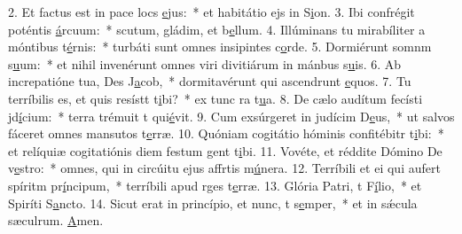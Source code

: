 2. Et factus est in pace locs \uline{e}jus:~* et habitátio ejs in S\uline{i}on.
3. Ibi confrégit poténtis \uline{á}rcuum:~* scutum, gládim, et b\uline{e}llum.
4. Illúminans tu mirabíliter a móntibus t\uline{é}rnis:~* turbáti sunt omnes insipintes c\uline{o}rde.
5. Dormiérunt somnm s\uline{u}um:~* et nihil invenérunt omnes viri divitiárum in mánbus s\uline{u}is.
6. Ab increpatióne tua, Des J\uline{a}cob,~* dormitavérunt qui ascendrunt \uline{e}quos.
7. Tu terríbilis es, et quis resístt t\uline{i}bi?~* ex tunc ra t\uline{u}a.
8. De cælo audítum fecísti jd\uline{í}cium:~* terra trémuit t qui\uline{é}vit.
9. Cum exsúrgeret in judícim D\uline{e}us,~* ut salvos fáceret omnes mansutos t\uline{e}rræ.
10. Quóniam cogitátio hóminis confitébitr t\uline{i}bi:~* et relíquiæ cogitatiónis diem festum gent t\uline{i}bi.
11. Vovéte, et réddite Dómino De v\uline{e}stro:~* omnes, qui in circúitu ejus affrtis m\uline{ú}nera.
12. Terríbili et ei qui aufert spíritm pr\uline{í}ncipum,~* terríbili apud rges t\uline{e}rræ.
13. Glória Patri, t F\uline{í}lio,~* et Spiríti S\uline{a}ncto.
14. Sicut erat in princípio, et nunc, t s\uline{e}mper,~* et in sǽcula sæculrum. \uline{A}men.
